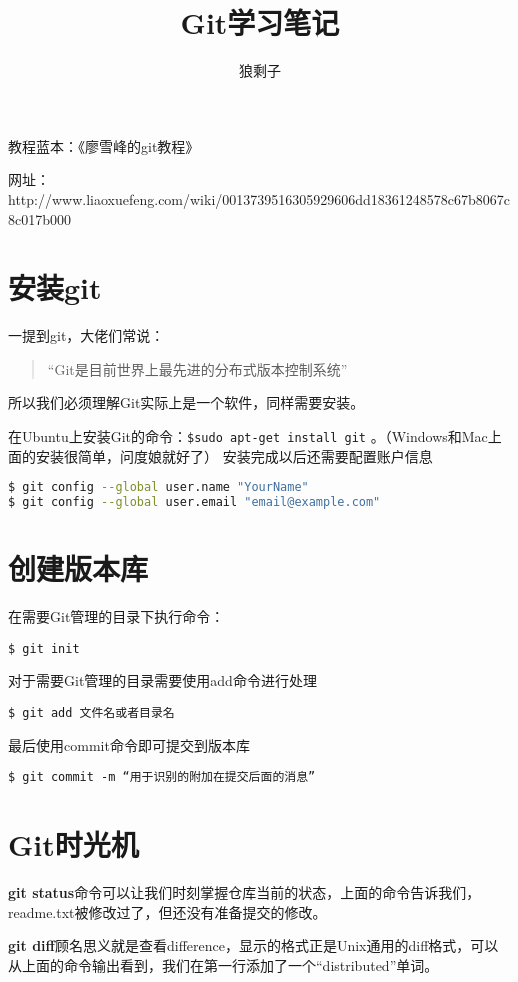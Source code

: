 \documentclass[UTF8]{ctexart}
\author{狼剩子}
\title{\zihao{0}\heiti Git学习笔记}
\newenvironment{myquote}
  {\begin{quote}\kaishu\zihao{-5}}
  {\end{quote}}
\begin{document}
\maketitle
{\center 教程蓝本：《廖雪峰的git教程》

网址：http://www.liaoxuefeng.com/wiki/0013739516305929606dd18361248578c67b8067c8c017b000}
\section{安装git}
一提到git，大佬们常说：
\begin{myquote}
\kaishu “Git是目前世界上最先进的分布式版本控制系统”
\end{myquote}





所以我们必须理解Git实际上是一个软件，同样需要安装。

在Ubuntu上安装Git的命令：\lstinline!$sudo apt-get install git! 。（Windows和Mac上面的安装很简单，问度娘就好了）
安装完成以后还需要配置账户信息
\begin{lstlisting}[language=bash]
$ git config --global user.name "YourName"
$ git config --global user.email "email@example.com"
\end{lstlisting}

\section{创建版本库}
在需要Git管理的目录下执行命令：
\begin{lstlisting}[caption=bash command]
$ git init
\end{lstlisting}
对于需要Git管理的目录需要使用add命令进行处理
\begin{lstlisting}[caption=bash command]
$ git add 文件名或者目录名
\end{lstlisting}
最后使用commit命令即可提交到版本库
\begin{lstlisting}[caption=bash command]
$ git commit -m “用于识别的附加在提交后面的消息”
\end{lstlisting}

\section{Git时光机}
\textbf{git status}命令可以让我们时刻掌握仓库当前的状态，上面的命令告诉我们，readme.txt被修改过了，但还没有准备提交的修改。

\textbf{git diff}顾名思义就是查看difference，显示的格式正是Unix通用的diff格式，可以从上面的命令输出看到，我们在第一行添加了一个“distributed”单词。
\end{document}
